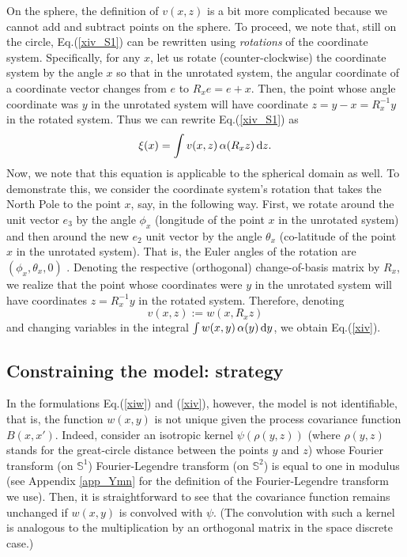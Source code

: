 \documentclass[12pt]{article}
\renewcommand{\S}{{\mathbb S}}
\renewcommand{\d}{{\rm d}}
\begin{document}
On the sphere, the definition of $v(x,z)$ is a bit more complicated because we cannot add and
subtract points on the sphere. To proceed, we note that, still on the circle, Eq.(\ref{xiv_S1}) can be rewritten
using  {\em rotations} of the coordinate system. 
Specifically, for any $x$, let us rotate (counter-clockwise) the coordinate system by the angle $x$
so that in the unrotated system, the angular coordinate of a  coordinate vector changes from $e$ to $R_x e = e+x$. 
Then, the point whose angle coordinate was $y$ in the unrotated system will have coordinate 
$z = y-x=R_x^{-1} y$ in the rotated system.
Thus we can rewrite Eq.(\ref{xiv_S1}) as
%
\begin {equation}
\label{xiv}
\xi(x) = \int v(x, z) \,\alpha(R_x z)  \,\d z.
\end {equation}
%
Now, we note that this equation is applicable to the spherical domain as well.
To demonstrate this, we consider 
the coordinate system's rotation that takes the 
North Pole to the point $x$, say, in the following way.
First, we rotate around the unit vector ${e}_3$ by the angle $\phi_x$ 
(longitude of the point $x$ in the unrotated system) and then around the new ${e}_2$ unit vector
by the angle $\theta_x$ 
(co-latitude of the point $x$ in the unrotated system). That is,
the Euler angles of the rotation are $(\phi_x, \theta_x, 0)$  \citep[][sec. 1.4.1]{Varshalovich}. 
Denoting the respective (orthogonal) change-of-basis matrix by $R_x$, we realize that
the point whose coordinates were $y$ in the unrotated system will have coordinates 
$z =R_x^{-1} y$ in the rotated system.
Therefore, denoting
%
\begin {equation}
\label{vw}
v(x,z) := w(x,R_x z)
\end {equation}
%
and changing  variables in the integral
$\int w(x, y) \,\alpha(y) \,\d y$,
we obtain Eq.(\ref{xiv}).








\subsection {Constraining the model: strategy}





In the formulations Eq.(\ref{xiw}) and (\ref{xiv}), however, the model is not identifiable, that is, 
the function $w(x, y)$ is not unique given the process covariance function  $B(x,x')$. Indeed, consider
an isotropic kernel $\psi(\rho(y,z))$ 
(where $\rho(y,z)$ stands for the great-circle distance between the points $y$ and $z$)
whose Fourier transform (on $\S^1$) Fourier-Legendre transform 
(on $\S^2$) is equal to one in modulus (see Appendix \ref{app_Ymn} for the definition of the Fourier-Legendre transform we use). 
Then, it is straightforward to see
that the covariance function remains unchanged if $w(x, y)$ is convolved
with $\psi$.
(The convolution with such a kernel is analogous to the multiplication by an orthogonal matrix
in the space discrete case.)
\end{document}
